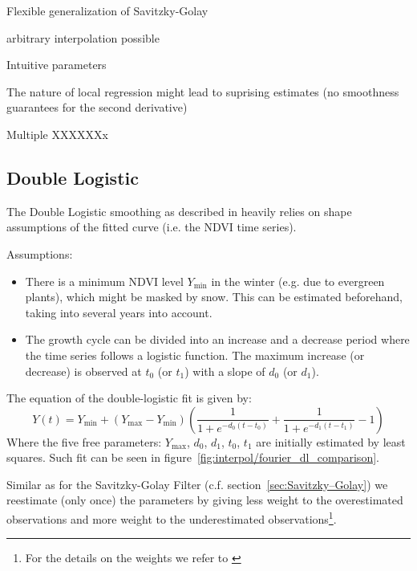\begin{my_pros_cons_table}{
    \item Flexible generalization of Savitzky-Golay
    \item arbitrary interpolation possible
    \item Intuitive parameters
  }{
    \item The nature of local regression might lead to suprising estimates (no smoothness guarantees for the second derivative)
    \item Multiple XXXXXXx
  }
\end{my_pros_cons_table}


\subsection{Double Logistic}
\label{sec:double_logistic}
The Double Logistic smoothing as described in \cite{beckImprovedMonitoringVegetation2006} heavily relies on shape assumptions of the fitted curve (i.e. the NDVI time series).

Assumptions:
\begin{itemize}
  \item There is a minimum NDVI level $Y_{\min}$ in the winter (e.g. due to evergreen plants), which might be masked by snow. This can be estimated beforehand, taking into several years into account.
  \item The growth cycle can be divided into an increase and a decrease period where the time series follows a logistic function. The maximum increase (or decrease) is observed at $t_0$ (or $t_1$) with a slope of $d_0$ (or $d_1$).
\end{itemize}

The equation of the double-logistic fit is given by:
\begin{equation*}
  Y(t) = Y_{\min} + \left(Y_{\max}-Y_{\min}\right)\left(\frac{1}{1+e^{-d_0(t-t_0)}}+\frac{1}{1+e^{-d_1(t-t_1)}}-1\right)
\end{equation*}
Where the five free parameters: $Y_{\max}$, $d_0$, $d_1$, $t_0$, $t_1$ are initially estimated by least squares. Such fit can be seen in figure~\ref{fig:interpol/fourier_dl_comparison}.

Similar as for the Savitzky-Golay Filter (c.f. section~\ref{sec:Savitzky–Golay}) we reestimate (only once) the parameters by giving less weight to the overestimated observations and more weight to the underestimated observations\footnote{For the details on the weights we refer to \cite{beckImprovedMonitoringVegetation2006}}.

